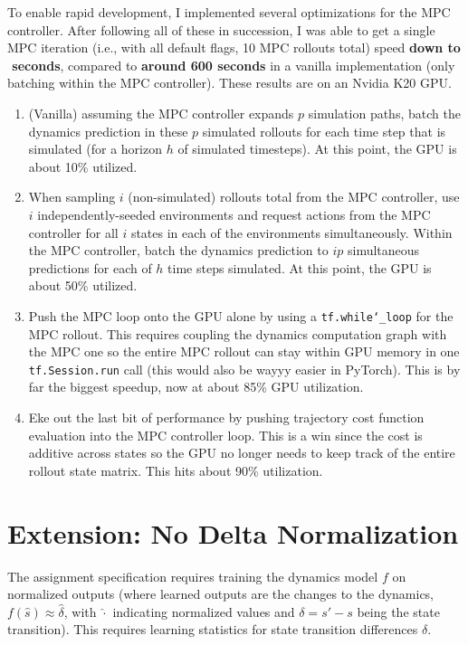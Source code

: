 \documentclass{article}
\begin{document}
To enable rapid development, I implemented several optimizations for the MPC controller. After following all of these in succession, I was able to get a single MPC iteration (i.e., with all default flags, 10 MPC rollouts total) speed \textbf{down to ${\mathbf{}}$ seconds}, compared to \textbf{around 600 seconds} in a vanilla implementation (only batching within the MPC controller). These results are on an Nvidia K20 GPU.
\begin{enumerate}
\item (Vanilla) assuming the MPC controller expands $p$ simulation paths, batch the dynamics prediction in these $p$ simulated rollouts for each time step that is simulated (for a horizon $h$ of simulated timesteps). At this point, the GPU is about 10\% utilized.
\item When sampling $i$ (non-simulated) rollouts total from the MPC controller, use $i$ independently-seeded environments and request actions from the MPC controller for all $i$ states in each of the environments simultaneously. Within the MPC controller, batch the dynamics prediction to $ip$ simultaneous predictions for each of $h$ time steps simulated. At this point, the GPU is about 50\% utilized.
\item Push the MPC loop onto the GPU alone by using a \texttt{tf.while\char`_loop} for the MPC rollout. This requires coupling the dynamics computation graph with the MPC one so the entire MPC rollout can stay within GPU memory in one \texttt{tf.Session.run} call (this would also be wayyy easier in PyTorch). This is by far the biggest speedup, now at about 85\% GPU utilization.
\item Eke out the last bit of performance by pushing trajectory cost function evaluation into the MPC controller loop. This is a win since the cost is additive across states so the GPU no longer needs to keep track of the entire rollout state matrix. This hits about 90\% utilization.
\end{enumerate}

\section{Extension: No Delta Normalization}

The assignment specification requires training the dynamics model $f$ on normalized outputs (where learned outputs are the changes to the dynamics, $f(\hat{s})\approx \hat{\delta}$, with $\hat{\cdot}$ indicating normalized values and $\delta=s'-s$ being the state transition). This requires learning statistics for state transition differences $\delta$.
\end{document}
